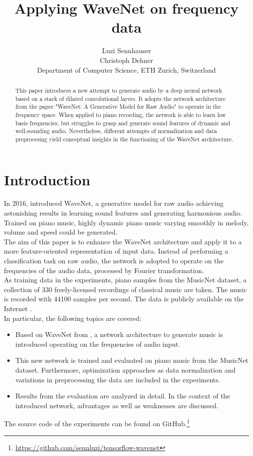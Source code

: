 \documentclass[10pt,conference,compsocconf]{IEEEtran}
\begin{document}
\title{Applying WaveNet on frequency data}

\author{
  Luzi Sennhauser\\
  Christoph Dehner\\
  Department of Computer Science, ETH Zurich, Switzerland
}

\maketitle

\begin{abstract}
	This paper introduces a new attempt to generate audio by a deep neural network based on a stack of dilated convolutional layers. It adopts the network architecture from the paper "WaveNet: A Generative Model for Raw Audio" to operate in the frequency space. When applied to piano recording, the network is able to learn low basis frequencies, but struggles to grasp and generate sound features of dynamic and well-sounding audio. Nevertheless, different attempts of normalization and data preprocesing yield conceptual insights in the functioning of the WaveNet architecture.
\end{abstract}

\section{Introduction}
In 2016, \cite{wavenet} introduced WaveNet, a generative model for raw audio achieving astonishing results in learning sound features and generating harmonious audio. Trained on piano music, highly dynamic piano music varying smoothly in melody, volume and speed could be generated.\\
The aim of this paper is to enhance the WaveNet architecture and apply it to a more feature-oriented representation of input data. Instead of performing a classification task on raw audio, the network is adopted to operate on the frequencies of the audio data, processed by Fourier transformation.\\
As training data in the experiments, piano samples from the MusicNet dataset, a collection of 330 freely-licensed recordings of classical music are taken. The music is recorded with 44100 samples per second. The data is publicly available on the Internet \cite{musicnet}.\\
In particular, the following topics are covered:
\begin{itemize}
\item Based on WaveNet from \cite{wavenet}, a network architecture to generate music is introduced operating on the frequencies of audio input.
\item This new network is trained and evaluated on piano music from the MusicNet dataset. Furthermore, optimization approaches as data normalization and variations in preprocessing the data are included in the experiments.
\item Results from the evaluation are analyzed in detail. In the context of the introduced network, advantages as well as weaknesses are discussed. 
\end{itemize}
The source code of the experiments can be found on GitHub.\footnote{\url{https://github.com/sennluzi/tensorflow-wavenet}}
\end{document}
